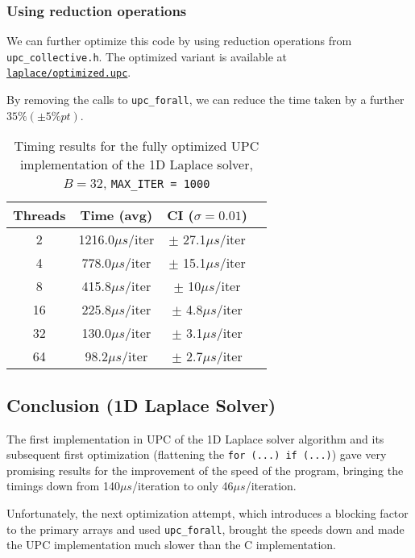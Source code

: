 \documentclass[12pt]{article}
\newcommand{\us}[0]{${\mu}s$}
\begin{document}
\subsubsection{Using reduction operations}

We can further optimize this code by using reduction operations from \texttt{upc\_collective.h}.
The optimized variant is available at \texttt{\href{https://github.com/adri326/pc40-upc/tree/main/laplace/ex5.upc}{laplace/optimized.upc}}.

By removing the calls to \texttt{upc\_forall}, we can reduce the time taken by a further $35\% (\pm 5\%pt)$.


\begin{table}[ht]
  \centering\begin{tabular}{|c|c|c|c|}
    \hline
    Threads & Time (avg) & CI ($\sigma=0.01$) \\
    \hline
    2 & 1216.0\us/iter & $\pm$ 27.1\us/iter \\
    4 & 778.0\us/iter & $\pm$ 15.1\us/iter \\
    8 & 415.8\us/iter & $\pm$ 10\us/iter \\
    16 & 225.8\us/iter & $\pm$ 4.8\us/iter \\
    32 & 130.0\us/iter & $\pm$ 3.1\us/iter \\
    64 & 98.2\us/iter & $\pm$ 2.7\us/iter \\
    \hline
  \end{tabular}
  \caption{Timing results for the fully optimized UPC implementation of the 1D Laplace solver, $B = 32$, \texttt{MAX\_ITER = 1000}}
  \label{tab:laplace6opt}
\end{table}

\subsection{Conclusion (1D Laplace Solver)}

The first implementation in UPC of the 1D Laplace solver algorithm and its subsequent first optimization (flattening the \texttt{for (...) if (...)}) gave very promising results for the improvement of the speed of the program, bringing the timings down from 140\us/iteration to only 46\us/iteration.

Unfortunately, the next optimization attempt, which introduces a blocking factor to the primary arrays and used \texttt{upc\_forall}, brought the speeds down and made the UPC implementation much slower than the C implementation.
\end{document}
